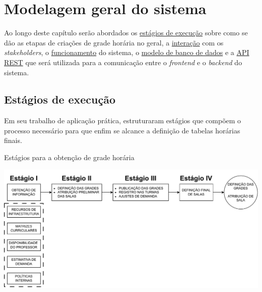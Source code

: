 \chapter{Modelagem geral do sistema} \label{chap:modelagem} %


Ao longo deste capítulo serão abordados os \hyperref[sec:estagios]{estágios de execução} sobre como se dão as etapas de criações de grade horária no geral, a \hyperref[sec:interacao]{interação} com os \textit{stakeholders}, o \hyperref[sec:funcionamento]{funcionamento} do sistema, o \hyperref[sec:ModelagemBD]{modelo de banco de dados} e a \hyperref[sec:REST]{API REST} que será utilizada para a comunicação entre o \textit{frontend} e o \textit{backend} do sistema.

\section{Estágios de execução} \label{sec:estagios} %

Em seu trabalho de aplicação prática,  estruturaram estágios que compõem o processo necessário para que enfim se alcance a definição de tabelas horárias finais.

\begin{CenteredFigure} \caption{Estágios para a obtenção de grade horária} \label{fig:geral}
  \includegraphics[width=\textwidth]{files/img/2.02!4-modelagem/Estágios Grade Final}
\end{CenteredFigure}

